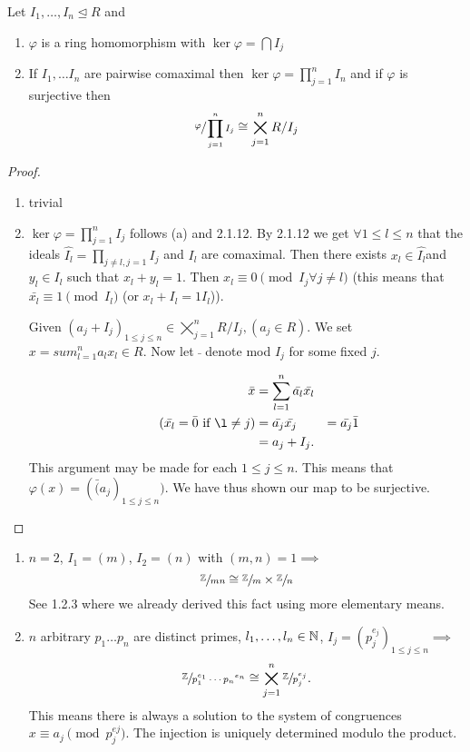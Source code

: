 \documentclass[master.tex]{subfiles}
\begin{document}
\begin{prop}
  Let \(I_1, \ldots, I_n \unlhd R\) and
  \begin{enumerate}[label=(\alph*)]
  \item \(\varphi\) is a ring homomorphism with \(\ker \varphi = \bigcap I_j\)
  \item If \(I_1, \ldots I_n\) are pairwise comaximal then \(\ker \varphi = \prod_{j=1}^n I_n\) and if \(\varphi\) is
    surjective then 
    \[\sfrac{\varphi}{ \prod_{j=1}^n I_j} \cong \bigtimes_{j=1}^n R/I_j\]
  \end{enumerate}
\end{prop}

\begin{proof}
  \begin{enumerate}[label=(\alph*)]
  \item trivial 
  \item \(\ker \varphi = \prod_{j=1}^n I_j\) follows (a) and 2.1.12.
    By 2.1.12 we get \(\forall 1 \le l \le n\) that the ideals \(\hat{I_l}=\prod_{j\neq l, j=1} I_j\) and \(I_l\) are
    comaximal. Then there exists \(x_l \in \hat{I_l}\)and \(y_l \in I_l\) such that \(x_l + y_l = 1\). Then \(x_l \equiv
    0 \pmod{I_j \forall j \neq l}\) (this means that \(\bar{x_l} \equiv 1 \pmod{I_l}\) (or \(x_l + I_l = 1 I_l\))). 

    Given \((a_j + I_j)_{1 \le j \le n} \in \bigtimes_{j=1}^n{R/I_j}, (a_j \in R)\). We set \(x=sum_{l=1}^n{a_l x_l} \in
    R\). Now let \(\bar{\phantom{}}\) denote mod \(I_j\) for some fixed \(j\). 

    \begin{align*}
      \bar{x} &= \sum_{l=1}^n \bar{a_l}\bar{x_l}\\ \tag{\(\bar{x_l}=\bar{0}\) if \(\l \neq j\)}
              &= \bar{a_j}\bar{x_j}
              &= \bar{a_j}\bar{1}\\
              &= a_j + I_j.
    \end{align*}
    This argument may be made for each \(1 \le j \le n\). This means that \(\varphi(x)=(\bar(a_j)_{1 \le j \le n})\). We
    have thus shown our map to be surjective.
  \end{enumerate}
\end{proof}
  \begin{example*}[Special Case \(R = \Z\)]
    \begin{enumerate}[label=(\alph*)]
    \item \(n=2\), \(I_1=(m)\), \(I_2=(n)\) with \((m,n)=1 \implies\)
      \[\sfrac{{\mathbb Z}}{mn} \cong \sfrac{{\mathbb Z}}{m} \times \sfrac{{\mathbb Z}}{n}\]
      See 1.2.3 where we already derived this fact using more elementary means.
    \item \(n\) arbitrary \(p_1 \ldots p_n\) are distinct primes, \(l_1, \ldots, l_n \in {\mathbb N}\), \(I_j = (p_j^{e_j})_{1
        \le j \le n} \implies\) \[\sfrac{{\mathbb Z}}{p_1^{e_1} \cdots {p_{n}}^{e_{n}}} \cong \bigtimes_{j=1}^n
        \sfrac{{\mathbb Z}}{p_j^{e_j}}.\]
      This means there is always a solution to the system of congruences \(x \equiv a_j \pmod{p_j^{ej}}\). The injection
      is uniquely determined modulo the product. 
    \end{enumerate}
  \end{example*}
\end{document}
